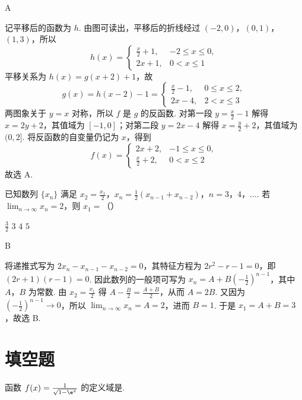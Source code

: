 \begin{answer}
A
\end{answer}

\begin{solution}
记平移后的函数为 \(h\). 由图可读出，平移后的折线经过 \((-2,0)\)，\((0,1)\)，\((1,3)\)，所以
\[
h(x)=
\begin{cases}
\frac{x}{2}+1,&-2\leqslant x\leqslant0,\\
2x+1,&0<x\leqslant1
\end{cases}
\]
平移关系为 \(h(x)=g(x+2)+1\)，故
\[
g(x)=h(x-2)-1=
\begin{cases}
\frac{x}{2}-1,&0\leqslant x\leqslant2,\\
2x-4,&2<x\leqslant3
\end{cases}
\]
两图象关于 \(y=x\) 对称，所以 \(f\) 是 \(g\) 的反函数. 对第一段 \(y=\frac{x}{2}-1\) 解得 \(x=2y+2\)，其值域为 \([-1,0]\)；对第二段 \(y=2x-4\) 解得 \(x=\frac{y}{2}+2\)，其值域为 \((0,2]\). 将反函数的自变量仍记为 \(x\)，得到
\[
f(x)=
\begin{cases}
2x+2,&-1\leqslant x\leqslant0,\\
\frac{x}{2}+2,&0<x\leqslant2
\end{cases}
\]
故选 A.
\end{solution}

\begin{problem}
已知数列 \(\{x_{n}\}\) 满足 \(x_{2} = \frac{x_{1}}{2}\)，\(x_{n} = \frac{1}{2} (x_{n - 1} + x_{n - 2})\)，\(n = 3\)，\(4\)，\(\dots\). 若 \(\displaystyle\lim_{n \to \infty} x_{n} = 2\)，则 \(x_{1} =\)（\quad）

\choices
    {\(\frac{3}{2}\)}
    {\(3\)}
    {\(4\)}
    {\(5\)}
\end{problem}

\begin{answer}
B
\end{answer}

\begin{solution}
将递推式写为 \(2x_n-x_{n-1}-x_{n-2}=0\)，其特征方程为 \(2r^2-r-1=0\)，即 \((2r+1)(r-1)=0\). 因此数列的一般项可写为 \(x_n=A+B\left(-\frac12\right)^{n-1}\)，其中 \(A\)，\(B\) 为常数. 由 \(x_2=\frac{x_1}{2}\) 得 \(A-\frac{B}{2}=\frac{A+B}{2}\)，从而 \(A=2B\). 又因为 \(\left(-\frac12\right)^{n-1}\to0\)，所以 \(\lim_{n\to\infty}x_n=A=2\)，进而 \(B=1\). 于是 \(x_1=A+B=3\)，故选 B.
\end{solution}

\section{填空题}
\begin{problem}
函数 \(f(x)=\frac{1}{\sqrt{1-\e^x}}\) 的定义域是\fillinblank{}.
\end{problem}

